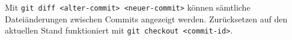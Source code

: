 Mit \lstinline|git diff <alter-commit> <neuer-commit>| können sämtliche Dateiänderungen zwischen Commits angezeigt werden. Zurücksetzen auf den aktuellen Stand funktioniert mit \lstinline|git checkout <commit-id>|.
